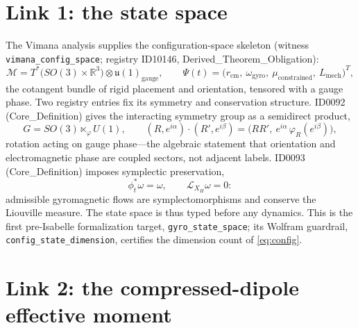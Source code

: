 \documentclass[11pt]{article}
\theoremstyle{remark}
\begin{document}
\section{Link 1: the state space}
\label{sec:state}

The Vimana analysis supplies the configuration-space skeleton (witness \texttt{vimana\_config\_space}; registry ID10146, Derived\_Theorem\_Obligation):
\begin{equation}
\mathcal{M} = T^*\big(SO(3) \times \mathbb{R}^3\big) \otimes \mathfrak{u}(1)_{\mathrm{gauge}}, \qquad
\Psi(t) = \big( r_{\mathrm{cm}},\ \omega_{\mathrm{gyro}},\ \mu_{\mathrm{constrained}},\ L_{\mathrm{mech}} \big)^{T},
\label{eq:config}
\end{equation}
the cotangent bundle of rigid placement and orientation, tensored with a gauge phase. Two registry entries fix its symmetry and conservation structure. ID0092 (Core\_Definition) gives the interacting symmetry group as a semidirect product,
\begin{equation}
G = SO(3) \ltimes_\varphi U(1), \qquad
(R, e^{i\alpha}) \cdot (R', e^{i\beta}) = \big( RR',\ e^{i\alpha}\, \varphi_R(e^{i\beta}) \big),
\end{equation}
rotation acting on gauge phase---the algebraic statement that orientation and electromagnetic phase are coupled sectors, not adjacent labels. ID0093 (Core\_Definition) imposes symplectic preservation,
\begin{equation}
\phi_t^\ast \omega = \omega, \qquad \mathcal{L}_{X_H} \omega = 0:
\end{equation}
admissible gyromagnetic flows are symplectomorphisms and conserve the Liouville measure. The state space is thus typed before any dynamics. This is the first pre-Isabelle formalization target, \texttt{gyro\_state\_space}; its Wolfram guardrail, \texttt{config\_state\_dimension}, certifies the dimension count of \eqref{eq:config}.

\section{Link 2: the compressed-dipole effective moment}
\label{sec:dipole}
\end{document}
